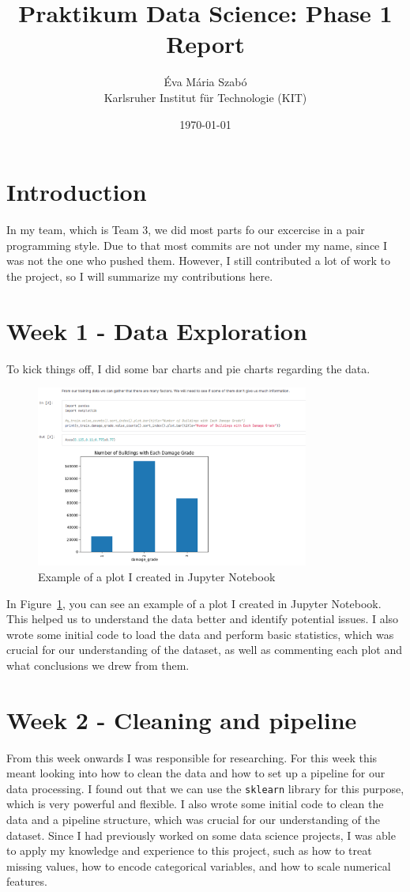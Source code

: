 \documentclass[a4paper,12pt]{article}
\title{Praktikum Data Science: Phase 1 Report}
\author{Éva Mária Szabó \\ \small Karlsruher Institut für Technologie (KIT)}
\date{\today}
\begin{document}
\maketitle
\tableofcontents
\newpage

\section{Introduction}
In my team, which is Team 3, we did most parts fo our excercise in a pair programming style. Due to that most commits are not under my name, since I was not the one who pushed them. However, I still contributed a lot of work to the project, so I will summarize my contributions here.

\section{Week 1 - Data Exploration}
To kick things off, I did some bar charts and pie charts regarding the data. 
\begin{figure}
    \centering
    \includegraphics[width=0.8\textwidth]{figures/example_plot_jupyter.png}
    \caption{Example of a plot I created in Jupyter Notebook}
    \label{fig:data_exploration}
\end{figure}
In Figure~\ref{fig:data_exploration}, you can see an example of a plot I created in Jupyter Notebook. This helped us to understand the data better and identify potential issues.
I also wrote some initial code to load the data and perform basic statistics, which was crucial for our understanding of the dataset, as well as commenting each plot and what conclusions we drew from them.

\section{Week 2 - Cleaning and pipeline}
From this week onwards I was responsible for researching. For this week this meant looking into how to clean the data and how to set up a pipeline for our data processing. I found out that we can use the \texttt{sklearn} library for this purpose, which is very powerful and flexible. I also wrote some initial code to clean the data and a pipeline structure, which was crucial for our understanding of the dataset. Since I had previously worked on some data science projects, I was able to apply my knowledge and experience to this project, such as how to treat missing values, how to encode categorical variables, and how to scale numerical features.
\end{document}
